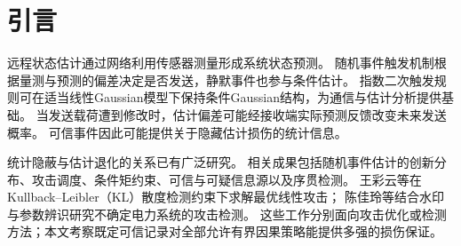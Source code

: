 \section*{引言}
远程状态估计通过网络利用传感器测量形成系统状态预测。
随机事件触发机制根据量测与预测的偏差决定是否发送，静默事件也参与条件估计。
指数二次触发规则可在适当线性Gaussian模型下保持条件Gaussian结构，为通信与估计分析提供基础\cite{han2015}。
当发送载荷遭到修改时，估计偏差可能经接收端实际预测反馈改变未来发送概率。
可信事件因此可能提供关于隐藏估计损伤的统计信息。

统计隐蔽与估计退化的关系已有广泛研究\cite{bai2017,shang2022,guo2025,song2022,xu2023,wei2026}。
相关成果包括随机事件估计的创新分布、攻击调度、条件矩约束、可信与可疑信息源以及序贯检测。
王彩云等\cite{wang2021}在Kullback--Leibler（KL）散度检测约束下求解最优线性攻击；
陈佳玲等\cite{chen2025}结合水印与参数辨识研究不确定电力系统的攻击检测。
这些工作分别面向攻击优化或检测方法；本文考察既定可信记录对全部允许有界因果策略能提供多强的损伤保证。

